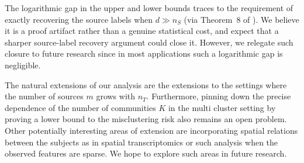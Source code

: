 \documentclass[10pt]{article}
\newcommand{\trg}{T}
\newcommand{\nT}{n_{\trg}}
\newcommand{\src}{S}
\newcommand{\nS}{n_{\src}}
\newcommand{\DeltaS}{\Delta_{\src}}
\begin{document}
%
The logarithmic gap in the upper and lower bounds traces to the requirement of exactly
recovering the source labels when $d \gg \nS$ (via Theorem~8 of \citet{Ndaoud2022}).
We believe it is a proof artifact rather than a genuine statistical cost, and expect that a sharper source-label recovery argument could close it. However, we relegate such closure to future research since in most applications such a logarithmic gap is negligible. 

The natural extensions of our analysis are the extensions to the settings where the number of sources $m$ grows with $\nT$. Furthermore, pinning down the precise dependence of the number of communities $K$ in the multi cluster setting by proving a lower bound to the misclustering risk also remains an open problem. Other potentially interesting areas of extension are incorporating spatial relations between the subjects as in spatial transcriptomics or such analysis when the observed features are sparse. We hope to explore such areas in future research.


\end{document}

